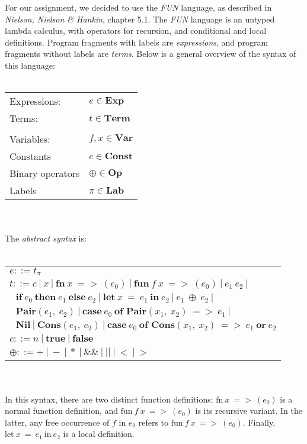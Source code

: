 \documentclass[a4paper,11pt]{article}
\begin{document}
For our assignment, we decided to use the \emph{FUN} language, as described in \emph{Nielson, Nielson \& Hankin}, chapter 5.1.
The \emph{FUN} language is an untyped lambda calculus, with operators for recursion, and conditional and local definitions.
Program fragments with labels are \emph{expressions}, and program fragments without labels are \emph{terms}.
Below is a general overview of the syntax of this language:
\\
\\
\begin{tabular}{l l}
Expressions: &	$e \in \textbf{Exp}$ \\
Terms: &		$t \in \textbf{Term}$ \\
 & \\
Variables: &		$f,x \in \textbf{Var}$ \\
Constants &		$c \in \textbf{Const} $ \\
Binary operators &	$\oplus \in \textbf{Op} $ \\
Labels &		$\pi \in \textbf{Lab} $ \\
\end{tabular}
\\
\\
The \emph{abstract syntax} is:
\\
\\
\begin{tabular}{l}
$e ::= t_\pi$ \\
$t ::= c\:|\:x\:|\:\textbf{fn}\:x\:=>\:(e_0)\:|\:\textbf{fun}\:f\:x\:=>\:(e_0)\:|\:e_1\:e_2\:|$ \\
$\:\:\:\textbf{if}\:e_0\:\textbf{then}\:e_1\:\textbf{else}\:e_2\:|\:\textbf{let}\:x\:=\:e_1\:\textbf{in}\:e_2\:|\:e_1\:\oplus\:e_2\:|$\\
$\:\:\:\textbf{Pair}(e_1,\:e_2)\:|\: \textbf{case}\:e_0\:\textbf{of Pair}(x_1,\:x_2)\:=>\:e_1\:|$ \\
$\:\:\:\textbf{Nil}\:|\:\textbf{Cons}(e_1,\:e_2)\:|\:\textbf{case}\:e_0\:\textbf{of Cons}(x_1,\:x_2)\:=>\:e_1\:\textbf{or}\:e_2$ \\
$c ::= n\:|\:\textbf{true}\:|\:\textbf{false}$ \\
$\oplus ::= +\:|\:-\:|\:*\:|\:\&\&\:|\:||\:|\:<\:|\:>$
\end{tabular}
\\
\\
In this syntax, there are two distinct function definitions: $\text{fn}\:x\:=>\:(e_0)$ is a normal function definition, and $\text{fun}\:f\:x\:=>\:(e_0)$ is its recursive variant.
In the latter, any free occurrence of $f$ in $e_0$ refers to $\text{fun}\:f\:x\:=>\:(e_0)$.
Finally, $\text{let}\:x\:=\:e_1\:\text{in}\:e_2$ is a local definition. 
\end{document}
